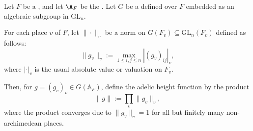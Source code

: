 \begin{definition} \label{definition:height_function_on_the_adelic_points_of_a_linear_algebraic_group_over_a_global_field_with_respect_to_an_embedding}
    Let $F$ be a , and let $\A_F$ be the . Let $G$ be a  defined over $F$ embedded as an algebraic subgroup in \(\mathrm{GL}_n\).

    For each place \(v\) of \(F\), let \(\|\cdot\|_v\) be a norm on \(G(F_v) \subseteq \mathrm{GL}_n(F_v)\) defined as follows:
    \[
    \|g_v\|_v := \max_{1 \leq i,j \leq n} |(g_v)_{ij}|_v,
    \]
    where \(|\cdot|_v\) is the usual absolute value or valuation on \(F_v\).

    Then, for \(g = (g_v)_{v} \in G(\mathbb{A}_F)\), define the adelic height function by the product
    \[
    \|g\| := \prod_{v} \|g_v\|_v,
    \]
    where the product converges due to \(\|g_v\|_v = 1\) for all but finitely many non-archimedean places.
\end{definition}